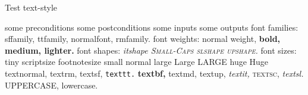 \begin{algorithm}
\caption{Test text-style}
\begin{algorithmic}
\REQUIRE some preconditions
\ENSURE some postconditions
\INPUT some inputs
\OUTPUT some outputs
  \STATE font families: {\sffamily sffamily, \ttfamily ttfamily, \normalfont normalfont, \rmfamily rmfamily.}
    \STATE font weights: {normal weight, \bfseries bold, \mdseries medium, \lfseries lighter. }
    \STATE font shapes: {\itshape itshape \scshape Small-Caps \slshape slshape \upshape upshape.}
    \STATE font sizes: \tiny tiny \scriptsize scriptsize \footnotesize
    footnotesize \small small \normalsize normal \large large \Large Large
    \LARGE LARGE \huge huge \Huge Huge \normalsize
\ENDPROCEDURE
{}
    \STATE \textnormal{textnormal,} \textrm{textrm,} \textsf{textsf,} \texttt{texttt.}
    \STATE \textbf{textbf,} \textmd{textmd,} 
    \STATE \textup{textup,} \textit{textit,} \textsc{textsc,} \textsl{textsl.}
    \STATE \uppercase{uppercase,} \lowercase{LOWERCASE.}
\ENDPROCEDURE
{}
\ENDPROCEDURE
\end{algorithmic}
\end{algorithm}